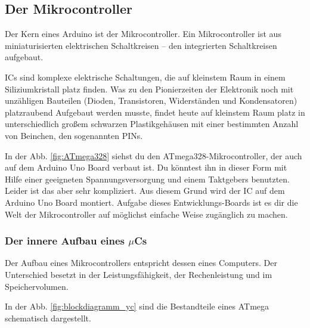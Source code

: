 %

\subsection{Der Mikrocontroller}

Der Kern eines Arduino ist der Mikrocontroller. Ein Mikrocontroller ist aus miniaturisierten elektrischen  Schaltkreisen -- den integrierten Schaltkreisen aufgebaut. 

ICs sind komplexe elektrische Schaltungen, die auf kleinstem Raum in einem Siliziumkristall platz finden.
Was zu den Pionierzeiten der Elektronik noch mit unzähligen Bauteilen (Dioden, Transistoren, Widerständen und Kondensatoren) platzraubend Aufgebaut werden musste, findet heute auf kleinstem Raum platz in unterschiedlich großem schwarzen Plastikgehäusen mit einer bestimmten Anzahl von Beinchen, den sogenannten PINs. 

In der Abb. \ref{fig:ATmega328} siehst du den ATmega328-Mikrocontroller, der auch auf dem
Arduino Uno Board verbaut ist.  Du könntest ihn in dieser Form mit Hilfe einer geeigneten Spannungsversorgung und einem Taktgebers benutzten. Leider ist das aber sehr kompliziert. Aus diesem Grund wird der IC auf dem Arduino Uno Board montiert. Aufgabe dieses Entwicklungs-Boards ist es dir die Welt der Mikrocontroller auf möglichst einfache Weise zugänglich zu machen.

\subsubsection{Der innere Aufbau eines $\mu$Cs}

Der Aufbau eines Mikrocontrollers entspricht dessen eines Computers. Der Unterschied besetzt in der Leistungsfähigkeit, der Rechenleistung und im Speichervolumen.   

In der Abb. \ref{fig:blockdiagramm_yc} sind die Bestandteile eines ATmega schematisch dargestellt.

